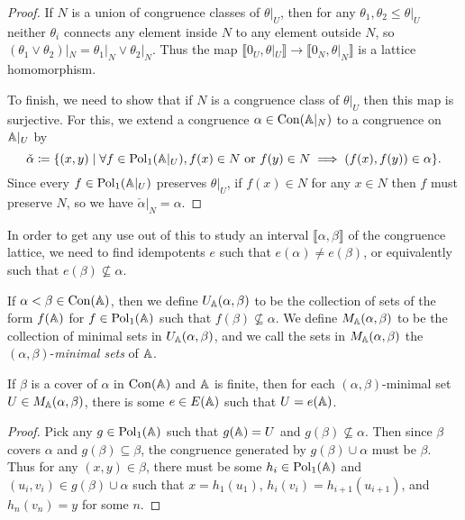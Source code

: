 \begin{appendices}
\begin{proof}
If $N$ is a union of congruence classes of $\theta|_U$, then for any $\theta_1, \theta_2 \le \theta|_U$ neither $\theta_i$ connects any element inside $N$ to any element outside $N$, so $(\theta_1 \vee \theta_2)|_N = \theta_1|_N \vee \theta_2|_N$. Thus the map $\llbracket 0_U, \theta|_U \rrbracket \rightarrow \llbracket 0_N, \theta|_N \rrbracket$ is a lattice homomorphism.

To finish, we need to show that if $N$ is a congruence class of $\theta|_U$ then this map is surjective. For this, we extend a congruence $\alpha \in \operatorname{Con}(\mathbb{A}|_N)$ to a congruence on $\mathbb{A}|_U$ by
\[
\check{\alpha} \coloneqq \{(x,y) \mid \forall f \in \operatorname{Pol}_1(\mathbb{A}|_U), f(x) \in N\text{ or }f(y)\in N \implies (f(x),f(y)) \in \alpha\}.
\]
Since every $f \in \operatorname{Pol}_1(\mathbb{A}|_U)$ preserves $\theta|_U$, if $f(x) \in N$ for any $x \in N$ then $f$ must preserve $N$, so we have $\check{\alpha}|_N = \alpha$.
\end{proof}

In order to get any use out of this to study an interval $\llbracket \alpha, \beta \rrbracket$ of the congruence lattice, we need to find idempotents $e$ such that $e(\alpha) \ne e(\beta)$, or equivalently such that $e(\beta) \not\subseteq \alpha$.

\begin{defn} If $\alpha < \beta \in \operatorname{Con}(\mathbb{A})$, then we define $U_{\mathbb{A}}(\alpha, \beta)$ to be the collection of sets of the form $f(\mathbb{A})$ for $f \in \operatorname{Pol}_1(\mathbb{A})$ such that $f(\beta) \not\subseteq \alpha$. We define $M_{\mathbb{A}}(\alpha, \beta)$ to be the collection of minimal sets in $U_{\mathbb{A}}(\alpha, \beta)$, and we call the sets in $M_{\mathbb{A}}(\alpha, \beta)$ the $(\alpha, \beta)$-\emph{minimal sets} of $\mathbb{A}$.
\end{defn}

\begin{prop}\label{prop-prime-tame} If $\beta$ is a cover of $\alpha$ in $\operatorname{Con}(\mathbb{A})$ and $\mathbb{A}$ is finite, then for each $(\alpha,\beta)$-minimal set $U \in M_{\mathbb{A}}(\alpha,\beta)$, there is some $e \in E(\mathbb{A})$ such that $U = e(\mathbb{A})$.
\end{prop}
\begin{proof} Pick any $g \in \operatorname{Pol}_1(\mathbb{A})$ such that $g(\mathbb{A}) = U$ and $g(\beta) \not\subseteq \alpha$. Then since $\beta$ covers $\alpha$ and $g(\beta) \subseteq \beta$, the congruence generated by $g(\beta) \cup \alpha$ must be $\beta$. Thus for any $(x,y) \in \beta$, there must be some $h_i \in \operatorname{Pol}_1(\mathbb{A})$ and $(u_i,v_i) \in g(\beta) \cup \alpha$ such that $x = h_1(u_1)$, $h_i(v_i) = h_{i+1}(u_{i+1})$, and $h_n(v_n) = y$ for some $n$.


\end{proof}
\end{appendices}
